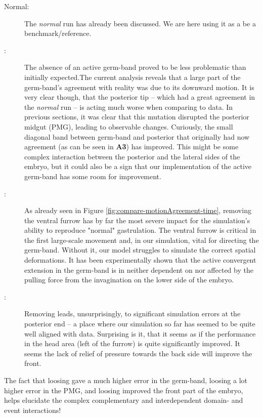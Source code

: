 \begin{description}
    \item[Normal:] The \textit{normal} run has already been discussed. We are here using it as a be a benchmark/reference. 
    \item[:] The absence of an active germ-band proved to be less problematic than initially expected.The current analysis reveals that a large part of the germ-band's agreement with reality was due to its downward motion. It is very clear though, that the posterior tip --  which had a great agreement in the \textit{normal} run -- is acting much worse when comparing to data. In previous sections, it was clear that this mutation disrupted the posterior midgut (PMG), leading to observable changes. Curiously, the small diagonal band between germ-band and posterior that originally had now agreement (as can be seen in \textbf{A3}) has improved. This might be some complex interaction between the posterior and the lateral sides of the embryo, but it could also be a sign that our implementation of the active germ-band has some room for improvement.\\
    \item[:] As already seen in Figure \ref{fig:compare-motionAgreement-time}, removing the ventral furrow has by far the most severe impact for the simulation’s ability to reproduce "normal" gastrulation. The ventral furrow is critical in the first large-scale movement and, in our simulation, vital for directing the germ-band. Without it, our model struggles to simulate the correct spatial deformations. It has been experimentally shown that the active convergent extension in the germ-band is in neither dependent on nor affected by the pulling force from the invagination on the lower side of the embryo.\cite{lye2024polarised} 
    \item[:] Removing  leads, unsurprisingly, to significant simulation errors at the posterior end -- a place where our simulation so far has seemed to be quite well aligned with data. Surprising is it, that it seems as if the performance in the head area (left of the  furrow) is quite significantly improved.
    It seems the lack of relief of pressure towards the back side will improve the front.  
\end{description}

The fact that loosing  gave a much higher error in the germ-band, loosing  a lot higher error in the PMG, and loosing  improved the front part of the embryo, helps elucidate the complex complementary and interdependent domain- and event interactions!



